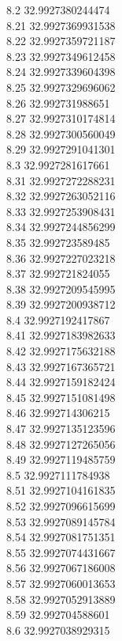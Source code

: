 {8.2	32.9927380244474\\
8.21	32.9927369931538\\
8.22	32.9927359721187\\
8.23	32.9927349612458\\
8.24	32.9927339604398\\
8.25	32.9927329696062\\
8.26	32.992731988651\\
8.27	32.9927310174814\\
8.28	32.9927300560049\\
8.29	32.9927291041301\\
8.3	32.9927281617661\\
8.31	32.9927272288231\\
8.32	32.9927263052116\\
8.33	32.9927253908431\\
8.34	32.9927244856299\\
8.35	32.992723589485\\
8.36	32.9927227023218\\
8.37	32.992721824055\\
8.38	32.9927209545995\\
8.39	32.9927200938712\\
8.4	32.9927192417867\\
8.41	32.9927183982633\\
8.42	32.9927175632188\\
8.43	32.9927167365721\\
8.44	32.9927159182424\\
8.45	32.9927151081498\\
8.46	32.992714306215\\
8.47	32.9927135123596\\
8.48	32.9927127265056\\
8.49	32.9927119485759\\
8.5	32.9927111784938\\
8.51	32.9927104161835\\
8.52	32.9927096615699\\
8.53	32.9927089145784\\
8.54	32.9927081751351\\
8.55	32.9927074431667\\
8.56	32.9927067186008\\
8.57	32.9927060013653\\
8.58	32.9927052913889\\
8.59	32.992704588601\\
8.6	32.9927038929315\\
}
